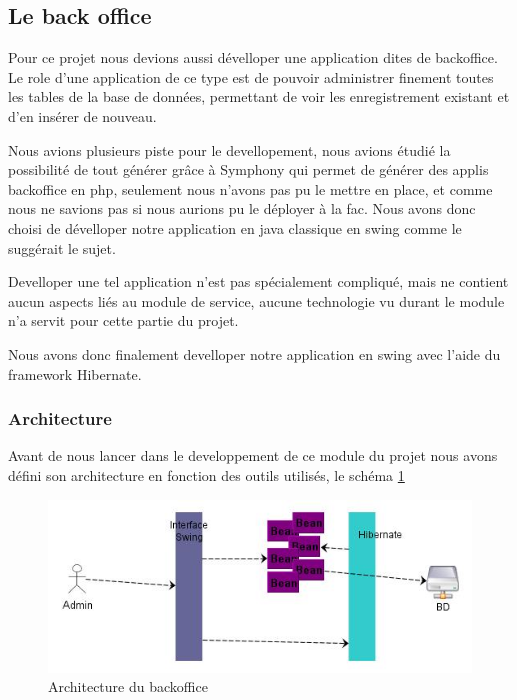 \documentclass[11pt,a4paper]{article}
\begin{document}
\subsection{Le back office}

Pour ce projet nous devions aussi dévelloper une application dites de backoffice. Le role d'une application de ce type est de pouvoir administrer finement toutes les tables de la base de données, permettant de voir les enregistrement existant et d'en insérer de nouveau. 

Nous avions plusieurs piste pour le devellopement, nous avions étudié la possibilité de tout générer grâce à Symphony qui permet de générer des applis backoffice en php, seulement nous n'avons pas pu le mettre en place, et comme nous ne savions pas si nous aurions pu le déployer à la fac. Nous avons donc choisi de dévelloper notre application en java classique en swing comme le suggérait le sujet.

Develloper une tel application n'est pas spécialement compliqué, mais ne contient aucun aspects liés au module de service, aucune technologie vu durant le module n'a servit pour cette partie du projet.

Nous avons donc finalement develloper notre application en swing avec l'aide du framework Hibernate. 


\subsubsection{Architecture}

Avant de nous lancer dans le developpement de ce module du projet nous avons défini son architecture en fonction des outils utilisés, le schéma \ref{backoffice} 

\begin{figure}[h]
  		\centering
  		\includegraphics{backoffice.jpg}
  		\caption{Architecture du backoffice}
  		\label{backoffice}
\end{figure}
\end{document}
